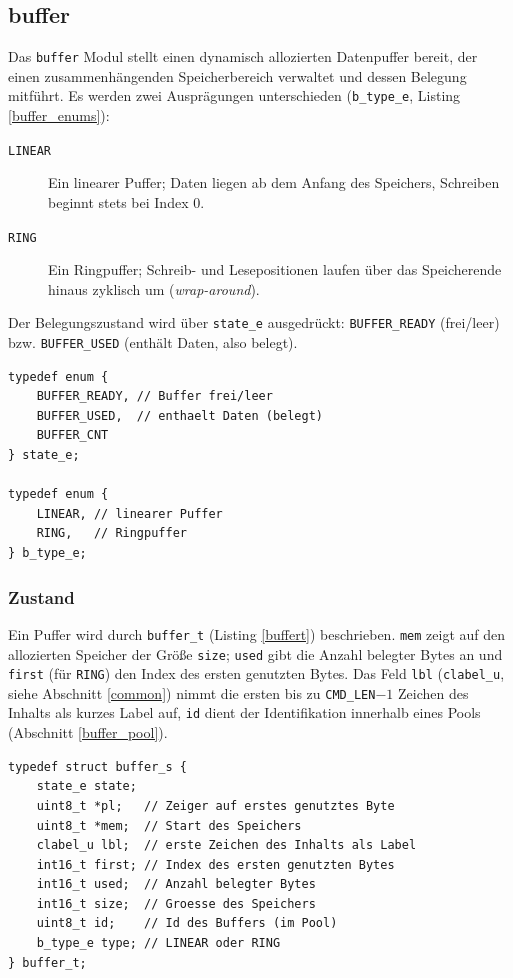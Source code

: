 \subsection{buffer}\label{buffer}
Das \verb|buffer| Modul stellt einen dynamisch allozierten Datenpuffer
bereit, der einen zusammenhängenden Speicherbereich verwaltet und dessen
Belegung mitführt. Es werden zwei Ausprägungen unterschieden
(\verb|b_type_e|, Listing \ref{buffer_enums}):
\begin{description}
\item[\texttt{LINEAR}] Ein linearer Puffer; Daten liegen ab dem Anfang des
  Speichers, Schreiben beginnt stets bei Index $0$.
\item[\texttt{RING}] Ein Ringpuffer; Schreib- und Lesepositionen laufen
  über das Speicherende hinaus zyklisch um (\emph{wrap-around}).
\end{description}
Der Belegungszustand wird über \verb|state_e| ausgedrückt:
\verb|BUFFER_READY| (frei/leer) bzw. \verb|BUFFER_USED| (enthält Daten,
also belegt).

\begin{listing}
\begin{verbatim}
typedef enum {
    BUFFER_READY, // Buffer frei/leer
    BUFFER_USED,  // enthaelt Daten (belegt)
    BUFFER_CNT
} state_e;

typedef enum {
    LINEAR, // linearer Puffer
    RING,   // Ringpuffer
} b_type_e;
\end{verbatim}
\caption{Aufzählungen \texttt{state\_e} und \texttt{b\_type\_e}}
\label{buffer_enums}
\end{listing}

\subsubsection*{Zustand}
Ein Puffer wird durch \verb|buffer_t| (Listing \ref{buffert})
beschrieben. \verb|mem| zeigt auf den allozierten Speicher der Größe
\verb|size|; \verb|used| gibt die Anzahl belegter Bytes an und
\verb|first| (für \verb|RING|) den Index des ersten genutzten Bytes. Das
Feld \verb|lbl| (\verb|clabel_u|, siehe Abschnitt \ref{common}) nimmt die
ersten bis zu \verb|CMD_LEN|$-1$ Zeichen des Inhalts als kurzes Label auf,
\verb|id| dient der Identifikation innerhalb eines Pools (Abschnitt
\ref{buffer_pool}).

\begin{listing}
\begin{verbatim}
typedef struct buffer_s {
    state_e state;
    uint8_t *pl;   // Zeiger auf erstes genutztes Byte
    uint8_t *mem;  // Start des Speichers
    clabel_u lbl;  // erste Zeichen des Inhalts als Label
    int16_t first; // Index des ersten genutzten Bytes
    int16_t used;  // Anzahl belegter Bytes
    int16_t size;  // Groesse des Speichers
    uint8_t id;    // Id des Buffers (im Pool)
    b_type_e type; // LINEAR oder RING
} buffer_t;
\end{verbatim}
\caption{Definition der \texttt{buffer\_t} Struktur}
\label{buffert}
\end{listing}

